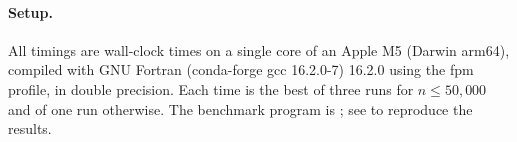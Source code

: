 \paragraph{Setup.} All timings are wall-clock times on a single core of an Apple M5 (Darwin arm64), compiled with GNU Fortran (conda-forge gcc 16.2.0-7) 16.2.0 using the fpm  profile, in double precision. Each time is the best of three runs for $n \le 50{,}000$ and of one run otherwise. The benchmark program is ; see  to reproduce the results.
